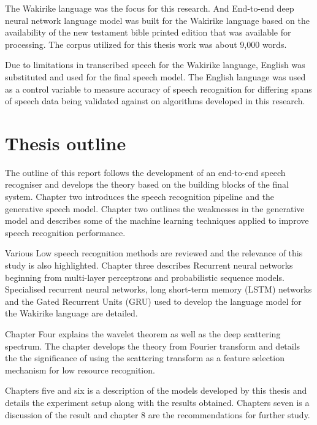 The Wakirike language was the focus for this research.  And End-to-end deep neural network language model was built for the Wakirike language based on the availability of the new testament bible printed edition that was available for processing.  The corpus utilized for this thesis work was about 9,000 words.

Due to limitations in transcribed speech for the Wakirike language, English was substituted and used for the final speech model.  The English language was used as a control variable to measure accuracy of speech recognition for differing spans of speech data being validated against on algorithms developed in this research.

\section{Thesis outline}
The outline of this report follows the development of an end-to-end speech recogniser and develops the theory based on the building blocks of the final system.  Chapter two introduces the speech recognition pipeline and the generative speech model.  Chapter two outlines the weaknesses in the generative model and describes some of the machine learning techniques applied to improve speech recognition performance. 

Various Low speech recognition methods are reviewed and the relevance of this study is also highlighted.  Chapter three describes Recurrent neural networks beginning from multi-layer perceptrons and probabilistic sequence models.  Specialised recurrent neural networks, long short-term memory (LSTM) networks and the Gated Recurrent Units (GRU) used to develop the language model for the Wakirike language are detailed.

Chapter Four explains the wavelet theorem as well as the deep scattering spectrum. The chapter develops the theory from Fourier transform and details the the significance of using the scattering transform as a feature selection mechanism for low resource recognition.  

Chapters five and six is a description of the models developed by this thesis and details the experiment setup along with the results obtained. Chapters seven is a discussion of the result and chapter 8 are the recommendations for further study. 


